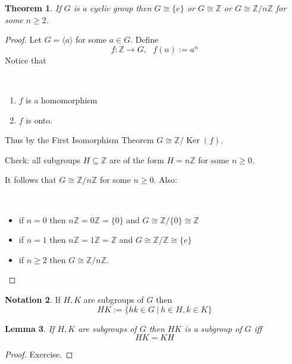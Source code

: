 \documentclass[12pt, letterpaper, oneside]{article}
\theoremstyle{plain}
\newtheorem{theorem}{Theorem}[section]
\newtheorem{lemma}[theorem]{Lemma}
\theoremstyle{definition}
\newtheorem{notation}[theorem]{Notation}
\newcommand{\Z}{{\mathbb Z}}
\newcommand{\Ker}{\operatorname{Ker}}
\newcommand{\subgp}[1]{\langle#1\rangle}
\newcommand{\vs}{\vskip 5mm}
\begin{document}
\begin{theorem}
If $G$ is a cyclic group then $G\cong \{ e\}$ or $G\cong \Z$ or $G\cong \Z/n\Z$ for some $n\geq 2$.
\end{theorem}

\begin{proof}
Let $G = \subgp{a}$ for some $a\in G$. Define
$$f\colon \Z \to G, \ \ \ f(n) := a^{n}$$
Notice that 

\vskip -13mm

\ 
\begin{enumerate}
\setlength{\itemsep}{1pt}
\item $f$ is a homomorphism
\item $f$ is onto. 
\end{enumerate}
Thus by the First Isomorphism Theorem $G\cong \Z/\Ker(f)$.

Check: all subgroups  $H\subseteq \Z$ are of the form $H= n\Z$ for some $n\geq 0$. 

It follows that $G\cong \Z/n\Z$ for some $n\geq 0$. Also:

\vskip -13mm

\ 
\begin{itemize}
\item if $n=0$ then $n\Z = 0\Z = \{0\}$ and $G\cong \Z/\{0\} \cong \Z$

\item if $n =1$ then $n\Z = 1\Z = \Z$ and $G\cong \Z/\Z \cong \{e\}$

\item if $n\geq 2$ then $G\cong \Z/n\Z$.

\end{itemize}


\end{proof}


\vs 

\begin{notation}
If $H, K$ are subgroups of $G$ then 
$$HK := \{ hk \in G \ | \ h\in H, k\in K\}$$
\end{notation}

\vs

\begin{lemma}
If $H, K$ are subgroups of $G$ then $HK$ is a subgroup of $G$ iff 
$$HK = KH$$

\end{lemma}

\begin{proof}
Exercise.
\end{proof}


\vs
\end{document}
